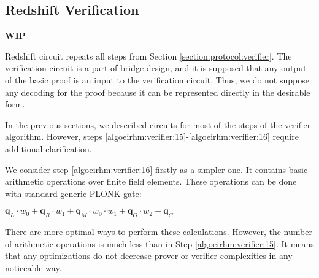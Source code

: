 \subsection{Redshift Verification}
\textbf{WIP}


Redshift circuit repeats all steps from Section \ref{section:protocol:verifier}.
The verification circuit is a part of bridge design, and it is supposed that any output of the basic proof is an input to the verification circuit. 
Thus, we do not suppose any decoding for the proof because it can be represented directly in the desirable form. 

In the previous sections, we described circuits for most of the steps of the verifier algorithm.
However, steps \ref{algoeirhm:verifier:15}-\ref{algoeirhm:verifier:16} require additional clarification.

We consider step \ref{algoeirhm:verifier:16} firstly as a simpler one.
It contains basic arithmetic operations over finite field elements. 
These operations can be done with standard generic PLONK gate:
\begin{center}
	$\textbf{q}_L \cdot w_0 + \textbf{q}_R \cdot w_1 + \textbf{q}_M \cdot w_0 \cdot w_1 + \textbf{q}_O \cdot w_2 + \textbf{q}_C$
\end{center}
There are more optimal ways to perform these calculations.
However, the number of arithmetic operations is much less than in  Step \ref{algoeirhm:verifier:15}.
It means that any optimizations do not decrease prover or verifier complexities in any noticeable way. 

